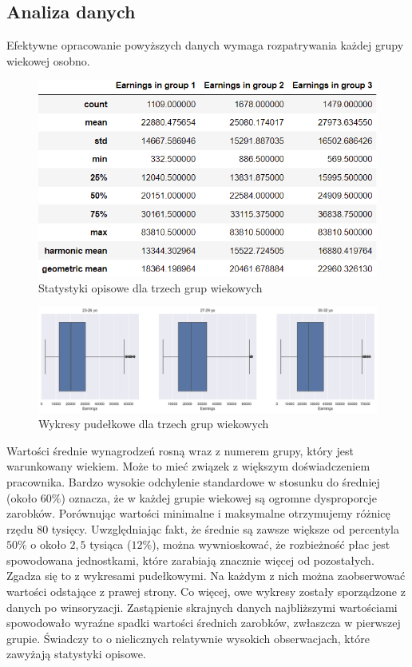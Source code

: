 \documentclass[12pt]{mwart}
\begin{document}
\subsection{Analiza danych}
\noindent Efektywne opracowanie powyższych danych wymaga rozpatrywania każdej grupy wiekowej osobno.

\begin{figure}[H]
	\begin{center}
	\includegraphics[scale=0.7]{compared1.png}
	\caption{Statystyki opisowe dla trzech grup wiekowych}
	\end{center}
\end{figure} 

\begin{figure}[H]
	\begin{center}
	\includegraphics[scale=0.37]{boxplot1.pdf}
	\caption{Wykresy pudełkowe dla trzech grup wiekowych}
	\end{center}
\end{figure} 

\noindent Wartości średnie wynagrodzeń rosną wraz z numerem grupy, który jest warunkowany wiekiem. Może to mieć związek z większym doświadczeniem pracownika. Bardzo wysokie odchylenie standardowe w stosunku do średniej (około $ 60 \% $) oznacza, że w każdej grupie wiekowej są ogromne dysproporcje zarobków. Porównując wartości minimalne i maksymalne otrzymujemy różnicę rzędu $80$ tysięcy. Uwzględniając fakt, że średnie są zawsze większe od percentyla $50\%$ o około $2,5$ tysiąca ($12\%$), można wywnioskować, że rozbieżność płac jest spowodowana jednostkami, które zarabiają znacznie więcej od pozostałych. Zgadza się to z wykresami pudełkowymi. Na każdym z nich można zaobserwować wartości odstające z prawej strony. Co więcej, owe wykresy zostały sporządzone z danych po winsoryzacji. Zastąpienie skrajnych danych najbliższymi wartościami spowodowało wyraźne spadki wartości średnich zarobków, zwłaszcza w pierwszej grupie. Świadczy to o nielicznych relatywnie wysokich obserwacjach, które zawyżają statystyki opisowe. \\ 
\end{document}

